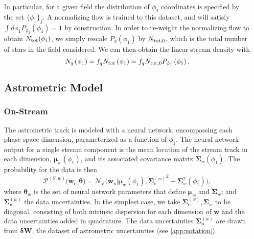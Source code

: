 \documentclass[twocolumn]{aastex631}
\newcommand{\mrm}[1]{\mathrm{#1}}
\newcommand{\mbs}[1]{\boldsymbol{#1}}
\newcommand{\mbf}[1]{\mathbf{#1}}
\newcommand{\mcal}[1]{\mathcal{#1}}
\newcommand{\pdf}{\mcal{P}}
\newcommand{\nth}[1]{{#1}_{\mrm{n}}}  %
\newcommand{\smallcomponent}[2]{#2^{\scriptscriptstyle (#1)}}
\newcommand{\cmp}[2]{\smallcomponent{#1}{#2}}
\newcommand{\astroM}[1]{{#1}_w}
\begin{document}
        In particular, for a given field the distribution of $\phi_1$
        coordinates is specified by the set $\{\phi_1\}_f$. A normalizing flow is
        trained to this dataset, and will satisfy $\int d\phi_1
        P_{\phi_f}(\phi_1) = 1$ by construction. In order to re-weight the
        normalizing flow to obtain $N_{\rm tot}(\phi_1)$, we simply rescale
        $P_{\phi}(\phi_1)$ by $N_{\rm tot,0}$, which is the total number of
        stars in the field considered. We can then obtain the linear stream
        density with
        \begin{equation}
            N_q\left(\phi_1\right) = f_q N_{\rm tot} \left(\phi_1\right)  = f_q N_{\rm tot,0} P_{\phi_1}\left(\phi_1\right) .
        \end{equation}

    
        
    \subsection{Astrometric Model} \label{sub:method:astrometric_model}

        \subsubsection{On-Stream} \label{ssub:method:astrometric_model:on_stream}
    
            The astrometric track is modeled with a neural network, encompassing
            each phase space dimension, parameterized as a function of $\phi_1$.
            The neural network output for a single stream component is the mean
            location of the stream track in each dimension,
            $\astroM{\mbs{\mu}}(\phi_1)$, and its associated covariance matrix
            $\astroM{\mbs{\Sigma}}(\phi_1)$. The probability for the data is
            then
            \begin{equation}
                \cmp{S,w}{\pdf}(\nth{\mbs{w}} | \mbs{\theta}) \!
                = \mcal{N}_F \big(\nth{\mbs{w}} | \astroM{\mbs{\mu}}\!(\phi_1), {\cmp{w}{\nth{\mbs{\Sigma}}}}^2 \! + \!  \astroM{\mbs{\Sigma}}^2\!\left(\phi_1\right) \!\big),
            \end{equation}
            where $\astroM{\mbs{\theta}}$ is the set of neural network
            parameters that define $\astroM{\mbs{\mu}}$ and
            $\astroM{\mbs{\Sigma}}$; and $\cmp{w}{\nth{\mbs{\Sigma}}}$ the data
            uncertainties.  In the simplest case, we take
            $\cmp{w}{\nth{\mbs{\Sigma}}}, \astroM{\mbs{\Sigma}}$ to be diagonal,
            consisting of both intrinsic dispersion for each dimension of
            $\mbs{w}$ and the data uncertainties added in quadrature. The data
            uncertainties $\cmp{w}{\nth{\mbs{\Sigma}}}$ are drawn from
            $\mbs{\delta}\mbf{W}$, the dataset of astrometric uncertainties (see
            \autoref{app:notation}).
\end{document}
